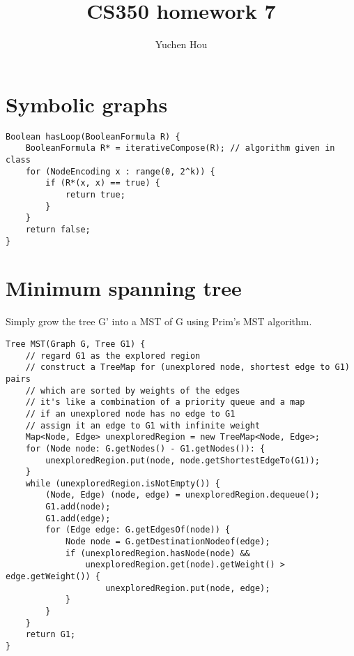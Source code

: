 \documentclass{article}
\begin{document}
\lstset{language=Java, tabsize=4}
\title{CS350 homework 7}
\author{Yuchen Hou}
\maketitle
\section{Symbolic graphs}
\begin{lstlisting}
Boolean hasLoop(BooleanFormula R) {
	BooleanFormula R* = iterativeCompose(R); // algorithm given in class
	for (NodeEncoding x : range(0, 2^k)) {
		if (R*(x, x) == true) {
			return true;
		}
	}
	return false;
}
\end{lstlisting}
\section{Minimum spanning tree}
Simply grow the tree G' into a MST of G using Prim's MST algorithm.
\begin{lstlisting}
Tree MST(Graph G, Tree G1) {
	// regard G1 as the explored region
	// construct a TreeMap for (unexplored node, shortest edge to G1) pairs
	// which are sorted by weights of the edges
	// it's like a combination of a priority queue and a map
	// if an unexplored node has no edge to G1
	// assign it an edge to G1 with infinite weight
	Map<Node, Edge> unexploredRegion = new TreeMap<Node, Edge>;
	for (Node node: G.getNodes() - G1.getNodes()): {
		unexploredRegion.put(node, node.getShortestEdgeTo(G1));
	}
	while (unexploredRegion.isNotEmpty()) {
		(Node, Edge) (node, edge) = unexploredRegion.dequeue();
		G1.add(node);
		G1.add(edge);
		for (Edge edge: G.getEdgesOf(node)) {
			Node node = G.getDestinationNodeof(edge);
			if (unexploredRegion.hasNode(node) &&
				unexploredRegion.get(node).getWeight() > edge.getWeight()) {
					unexploredRegion.put(node, edge);
			}
		}
	}
	return G1;
}
\end{lstlisting}
\end{document}
